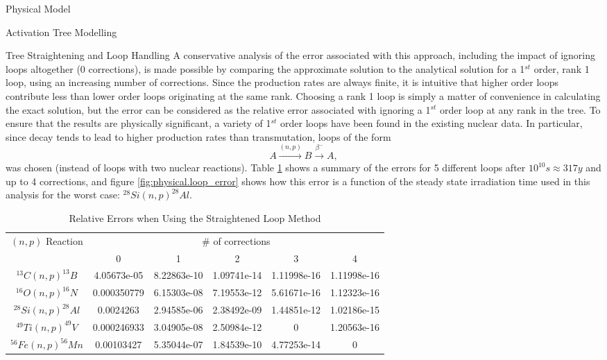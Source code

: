 \begin{chapter}{Physical Model\label{chap:physical}}
\begin{section}{Activation Tree Modelling\label{sec:physical.chains}}
\begin{subsection}{Tree Straightening and Loop Handling}
    A conservative analysis of the error associated with this
    approach, including the impact of ignoring loops altogether (0
    corrections), is made possible by comparing the approximate
    solution to the analytical solution for a 1$^{st}$ order, rank 1
    loop, using an increasing number of corrections.  Since the
    production rates are always finite, it is intuitive that higher
    order loops contribute less than lower order loops originating at
    the same rank.  Choosing a rank 1 loop is simply a matter of
    convenience in calculating the exact solution, but the error can
    be considered as the relative error associated with ignoring a
    1$^{st}$ order loop at any rank in the tree.  To ensure that the
    results are physically significant, a variety of 1$^{st}$ order
    loops have been found in the existing nuclear data.  In
    particular, since decay tends to lead to higher production rates
    than transmutation, loops of the form
    $$A \stackrel{(n,p)}{\longrightarrow} B
    \stackrel{\beta^-}{\longrightarrow} A,$$
    was chosen (instead of
    loops with two nuclear reactions).  Table
    \ref{tab:physical.loop_error} shows a summary of the errors for 5
    different loops after $10^{10} s \approx 317 y$ and up to 4
    corrections, and figure \ref{fig:physical.loop_error} shows how
    this error is a function of the steady state irradiation time used
    in this analysis for the worst case: $^{28}Si(n,p)^{28}Al$.
    
    \begin{table}
      \begin{center}
        \caption{Relative Errors when Using the Straightened Loop
          Method}\label{tab:physical.loop_error}
        \begin{tabular}{|c|c|c|c|c|c|} \hline
          $(n,p)$ Reaction & \multicolumn{5}{c|}{\# of
            corrections}\\\cline{2-6}
          & 0 & 1 & 2 & 3 & 4 \\\hline\hline
          $^{13}C(n,p)^{13}B$ & 4.05673e-05 & 8.22863e-10 & 1.09741e-14 &
          1.11998e-16 & 1.11998e-16\\\hline
          $^{16}O(n,p)^{16}N$ & 0.000350779 & 6.15303e-08 & 7.19553e-12 &
          5.61671e-16 & 1.12323e-16 \\\hline
          $^{28}Si(n,p)^{28}Al$ & 0.0024263 & 2.94585e-06 & 2.38492e-09 &
          1.44851e-12 & 1.02186e-15 \\\hline
          $^{49}Ti(n,p)^{49}V$ & 0.000246933 & 3.04905e-08 & 2.50984e-12 & 0 &
          1.20563e-16\\\hline
          $^{56}Fe(n,p)^{56}Mn$ & 0.00103427 & 5.35044e-07 & 1.84539e-10 &
          4.77253e-14 & 0\\\hline\hline
        \end{tabular}
      \end{center}
    \end{table}
    

\end{subsection}
\end{section}
\end{chapter}
